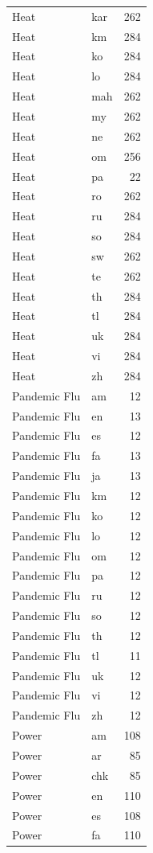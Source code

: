 \begin{longtable}{p{3cm} p{3cm} r}
Heat & kar & 262 \\
Heat & km & 284 \\
Heat & ko & 284 \\
Heat & lo & 284 \\
Heat & mah & 262 \\
Heat & my & 262 \\
Heat & ne & 262 \\
Heat & om & 256 \\
Heat & pa & 22 \\
Heat & ro & 262 \\
Heat & ru & 284 \\
Heat & so & 284 \\
Heat & sw & 262 \\
Heat & te & 262 \\
Heat & th & 284 \\
Heat & tl & 284 \\
Heat & uk & 284 \\
Heat & vi & 284 \\
Heat & zh & 284 \\
Pandemic Flu & am & 12 \\
Pandemic Flu & en & 13 \\
Pandemic Flu & es & 12 \\
Pandemic Flu & fa & 13 \\
Pandemic Flu & ja & 13 \\
Pandemic Flu & km & 12 \\
Pandemic Flu & ko & 12 \\
Pandemic Flu & lo & 12 \\
Pandemic Flu & om & 12 \\
Pandemic Flu & pa & 12 \\
Pandemic Flu & ru & 12 \\
Pandemic Flu & so & 12 \\
Pandemic Flu & th & 12 \\
Pandemic Flu & tl & 11 \\
Pandemic Flu & uk & 12 \\
Pandemic Flu & vi & 12 \\
Pandemic Flu & zh & 12 \\
Power & am & 108 \\
Power & ar & 85 \\
Power & chk & 85 \\
Power & en & 110 \\
Power & es & 108 \\
Power & fa & 110 \\

\end{longtable}
